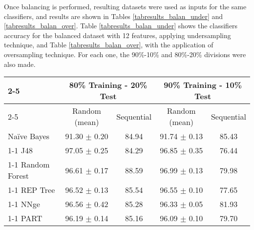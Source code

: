 \documentclass{llncs}
\begin{document}
Once balancing is performed, resulting datasets were used as inputs for the same classifiers, and results are shown in Tables \ref{tabresults_balan_under} and \ref{tabresults_balan_over}. Table \ref{tabresults_balan_under} shows the classifiers accuracy for the balanced dataset with 12 features, applying undersampling technique, and Table \ref{tabresults_balan_over}, with the application of oversampling technique. For each one, the 90\%-10\% and 80\%-20\% divisions were also made.

\begin{table*}[htpb]
\centering
 \caption{\label{tabresults_balan_under} Percentage of correctly classified patterns for the balanced dataset with 12 features, applying undersampling technique.}
{\small
\begin{tabular}{|l|c|c|c|c|}
\cline{2-5}
\multicolumn{1}{l|}{} & \multicolumn{2}{c|}{80\% Training - 20\% Test} & \multicolumn{2}{c|}{90\% Training - 10\% Test} \\
\cline{2-5}
\multicolumn{1}{l|}{} & Random (mean) & Sequential & Random (mean) & Sequential \\
\hline
Naïve Bayes & 91.30 $\pm$ 0.20 & 84.94 & 91.74 $\pm$ 0.13 & 85.43 \\
\cline{1-1}
J48 & 97.05 $\pm$ 0.25 & 84.29 & 96.85 $\pm$ 0.35 & 76.44 \\
\cline{1-1}
Random Forest & 96.61 $\pm$ 0.17 & 88.59 & 96.99 $\pm$ 0.13 & 79.98 \\
\cline{1-1}
REP Tree & 96.52 $\pm$ 0.13 & 85.54 & 96.55 $\pm$ 0.10 & 77.65 \\
\cline{1-1}
NNge & 96.56 $\pm$ 0.42 & 85.28 & 96.33 $\pm$ 0.05 & 81.93 \\
\cline{1-1}
PART & 96.19 $\pm$ 0.14 & 85.16 & 96.09 $\pm$ 0.10 & 79.70 \\
\hline
\end{tabular}
}
\end{table*}
\end{document}

